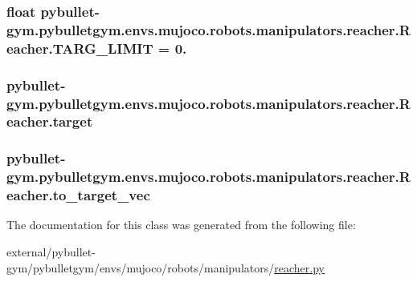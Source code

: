 \subsubsection[{\texorpdfstring{T\+A\+R\+G\+\_\+\+L\+I\+M\+IT}{TARG_LIMIT}}]{\setlength{\rightskip}{0pt plus 5cm}float pybullet-\/gym.\+pybulletgym.\+envs.\+mujoco.\+robots.\+manipulators.\+reacher.\+Reacher.\+T\+A\+R\+G\+\_\+\+L\+I\+M\+IT = 0.\hspace{0.3cm}{\ttfamily [static]}}\hypertarget{classpybullet-gym_1_1pybulletgym_1_1envs_1_1mujoco_1_1robots_1_1manipulators_1_1reacher_1_1_reacher_a56f3581eee3e02dc7b43b66d91130a0e}{}\label{classpybullet-gym_1_1pybulletgym_1_1envs_1_1mujoco_1_1robots_1_1manipulators_1_1reacher_1_1_reacher_a56f3581eee3e02dc7b43b66d91130a0e}
\subsubsection[{\texorpdfstring{target}{target}}]{\setlength{\rightskip}{0pt plus 5cm}pybullet-\/gym.\+pybulletgym.\+envs.\+mujoco.\+robots.\+manipulators.\+reacher.\+Reacher.\+target}\hypertarget{classpybullet-gym_1_1pybulletgym_1_1envs_1_1mujoco_1_1robots_1_1manipulators_1_1reacher_1_1_reacher_a8ed74b561a6e1333e5eb71a3ed404280}{}\label{classpybullet-gym_1_1pybulletgym_1_1envs_1_1mujoco_1_1robots_1_1manipulators_1_1reacher_1_1_reacher_a8ed74b561a6e1333e5eb71a3ed404280}
\subsubsection[{\texorpdfstring{to\+\_\+target\+\_\+vec}{to_target_vec}}]{\setlength{\rightskip}{0pt plus 5cm}pybullet-\/gym.\+pybulletgym.\+envs.\+mujoco.\+robots.\+manipulators.\+reacher.\+Reacher.\+to\+\_\+target\+\_\+vec}\hypertarget{classpybullet-gym_1_1pybulletgym_1_1envs_1_1mujoco_1_1robots_1_1manipulators_1_1reacher_1_1_reacher_aafccf9c853d8c4dc6b0d85764bce1508}{}\label{classpybullet-gym_1_1pybulletgym_1_1envs_1_1mujoco_1_1robots_1_1manipulators_1_1reacher_1_1_reacher_aafccf9c853d8c4dc6b0d85764bce1508}


The documentation for this class was generated from the following file\+:\begin{DoxyCompactItemize}
\item 
external/pybullet-\/gym/pybulletgym/envs/mujoco/robots/manipulators/\hyperlink{mujoco_2robots_2manipulators_2reacher_8py}{reacher.\+py}\end{DoxyCompactItemize}
